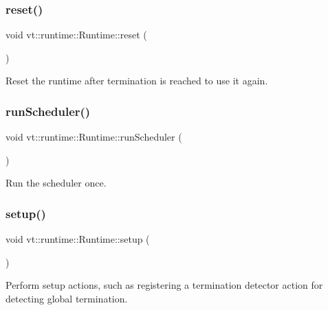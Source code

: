\subsubsection{\texorpdfstring{reset()}{reset()}}
{\footnotesize\ttfamily void vt\+::runtime\+::\+Runtime\+::reset (\begin{DoxyParamCaption}{ }\end{DoxyParamCaption})}



Reset the runtime after termination is reached to use it again. 

\mbox{\label{structvt_1_1runtime_1_1_runtime_ab9cfe09835261971b73435e0572fee00}} 
\subsubsection{\texorpdfstring{run\+Scheduler()}{runScheduler()}}
{\footnotesize\ttfamily void vt\+::runtime\+::\+Runtime\+::run\+Scheduler (\begin{DoxyParamCaption}{ }\end{DoxyParamCaption})}



Run the scheduler once. 

\mbox{\label{structvt_1_1runtime_1_1_runtime_a1c4fda11afb43bb2607cd1f00686550c}} 
\subsubsection{\texorpdfstring{setup()}{setup()}}
{\footnotesize\ttfamily void vt\+::runtime\+::\+Runtime\+::setup (\begin{DoxyParamCaption}{ }\end{DoxyParamCaption})\hspace{0.3cm}{\ttfamily [protected]}}



Perform setup actions, such as registering a termination detector action for detecting global termination. 

\mbox{\label{structvt_1_1runtime_1_1_runtime_ab1dc72260d0003004cce1418a8880aa7}} 
